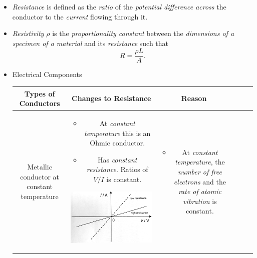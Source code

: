 \documentclass[oneside]{book}
\begin{document}
\begin{itemize}
    \item \emph{Resistance} is defined as the \emph{ratio} of the \emph{potential difference across} the conductor to the \emph{current} flowing through it.
    \item \emph{Resistivity} \(\rho\) is the \emph{proportionality constant} between the \emph{dimensions of a specimen of a material} and its \emph{resistance} such that 
    \[R=\frac{\rho L}{A}.\]
    \newpage
    \item Electrical Components
    \begin{longtable}{|Sc|Sc|Sc|}
        \hline
        Types of Conductors & Changes to Resistance & Reason\\
        \hline
        \begin{minipage}{0.25\textwidth}
            Metallic conductor at constant temperature
        \end{minipage} &  
        \begin{minipage}{0.3\textwidth}
            \begin{itemize}
                \item At \emph{ constant temperature} this is an Ohmic conductor.
                \item Has \emph{constant resistance}. Ratios of \(V/I\) is constant.
            \end{itemize} 
            \includegraphics[width=\textwidth]{../images/MetallicConductor I-V.jpg}
        \end{minipage} &
        \begin{minipage}{0.3\textwidth}
            \begin{itemize}
                \item At \emph{constant temperature}, the \emph{number of free electrons} and the \emph{rate of atomic vibration} is constant.

\end{itemize}
\end{minipage}
\end{longtable}
\end{itemize}
\end{document}
